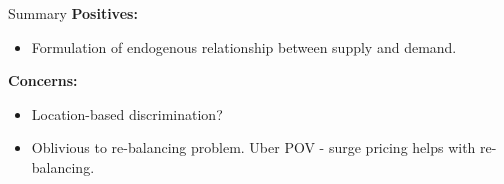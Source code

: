     \begin{frame}{Summary}
    	\textbf{Positives:}
    	\begin{itemize}
    		\item Formulation of endogenous relationship between supply and demand.
    	\end{itemize}
    		\vspace{0.1in}
    		\pause
    	\textbf{Concerns:}
    	\begin{itemize}
    		\item \alert{Location-based discrimination?}
    		\item \alert{Oblivious to re-balancing problem. Uber POV - surge pricing helps with re-balancing.}
    	\end{itemize}
    \end{frame}